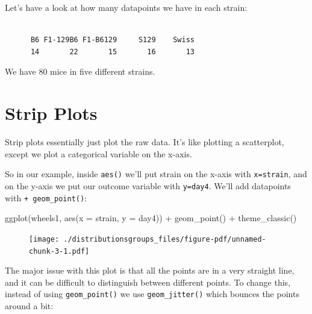 \documentclass[
  letterpaper,
  DIV=11,
  numbers=noendperiod]{scrreprt}
\newenvironment{Shaded}{\begin{snugshade}}{\end{snugshade}}
\newcommand{\AttributeTok}[1]{\textcolor[rgb]{0.40,0.45,0.13}{#1}}
\newcommand{\FunctionTok}[1]{\textcolor[rgb]{0.28,0.35,0.67}{#1}}
\newcommand{\NormalTok}[1]{\textcolor[rgb]{0.00,0.23,0.31}{#1}}
\newcommand{\SpecialCharTok}[1]{\textcolor[rgb]{0.37,0.37,0.37}{#1}}
\begin{document}
Let's have a look at how many datapoints we have in each strain:

\begin{Shaded}
\end{Shaded}

\begin{verbatim}

      B6 F1-129B6 F1-B6129     S129    Swiss 
      14       22       15       16       13 
\end{verbatim}

We have 80 mice in five different strains.

\hypertarget{strip-plots}{%
\section{Strip Plots}\label{strip-plots}}

Strip plots essentially just plot the raw data. It's like plotting a
scatterplot, except we plot a categorical variable on the x-axis.

So in our example, inside \texttt{aes()} we'll put strain on the x-axis
with \texttt{x=strain}, and on the y-axis we put our outcome variable
with \texttt{y=day4}. We'll add datapoints with
\texttt{+\ geom\_point()}:

\begin{Shaded}
\begin{Highlighting}[]
\FunctionTok{ggplot}\NormalTok{(wheels1, }\FunctionTok{aes}\NormalTok{(}\AttributeTok{x =}\NormalTok{ strain, }\AttributeTok{y =}\NormalTok{ day4)) }\SpecialCharTok{+} 
  \FunctionTok{geom\_point}\NormalTok{()  }\SpecialCharTok{+}
  \FunctionTok{theme\_classic}\NormalTok{()}
\end{Highlighting}
\end{Shaded}

\begin{figure}[H]

{\centering \texttt{[image: ./distributionsgroups\_files/figure-pdf/unnamed-chunk-3-1.pdf]}

}

\end{figure}

The major issue with this plot is that all the points are in a very
straight line, and it can be difficult to distinguish between different
points. To change this, instead of using \texttt{geom\_point()} we use
\texttt{geom\_jitter()} which bounces the points around a bit:
\end{document}
